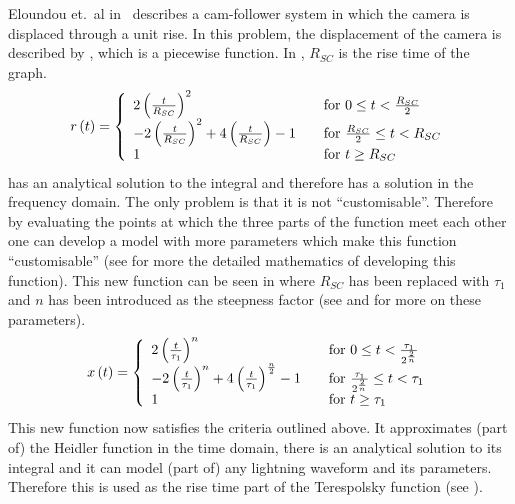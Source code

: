 Eloundou et.\ al in~\cite{Eloundou2002} describes a cam-follower system in which the camera is displaced through a unit rise. In this problem, the displacement of the camera is described by , which is a piecewise function. In , $R_{SC}$ is the rise time of the graph.
\begin{equation}
	r \left( t \right) = \left\{
	  \begin{array}{l l}
	    2 \left( \frac{t}{R_{SC}} \right )^2 & \quad \textrm{for $0 \leq t < \frac{R_{SC}}{2}$} \\
	    -2 \left( \frac{t}{R_{SC}} \right )^2 +4 \left( \frac{t}{R_{SC}} \right ) -1 & \quad \textrm{for $\frac{R_{SC}}{2} \leq t < R_{SC}$} \\
	    1 & \quad \textrm{for $t \geq R_{SC}$}
	  \end{array} \right.
	\label{eqn:eloundou}
\end{equation}
 has an analytical solution to the integral and therefore has a solution in the frequency domain. The only problem is that it is not ``customisable''. Therefore by evaluating the points at which the three parts of the function meet each other one can develop a model with more parameters which make this function ``customisable'' (see  for more the detailed mathematics of developing this function). This new function can be seen in  where $R_{SC}$ has been replaced with $\tau_1$ and $n$ has been introduced as the steepness factor (see  and  for more on these parameters).
\begin{equation}
	x \left( t \right) = \left\{
	  \begin{array}{l l}
	    2 \left( \frac{t}{\tau_1} \right )^n & \quad \textrm{for $0 \leq t < \frac{\tau_1}{2^{\frac{2}{n}}}$} \\
	    -2 \left( \frac{t}{\tau_1} \right )^n +4 \left( \frac{t}{\tau_1} \right )^{\frac{n}{2}} -1 & \quad \textrm{for $\frac{\tau_1}{2^{\frac{2}{n}}} \leq t < \tau_1$} \\
	    1 & \quad \textrm{for $t \geq \tau_1$}
	  \end{array} \right.
	\label{eqn:elRiseCust}
\end{equation}
This new function now satisfies the criteria outlined above. It approximates (part of) the Heidler function in the time domain, there is an analytical solution to its integral and it can model (part of) any lightning waveform and its parameters. Therefore this is used as the rise time part of the Terespolsky function (see ).

